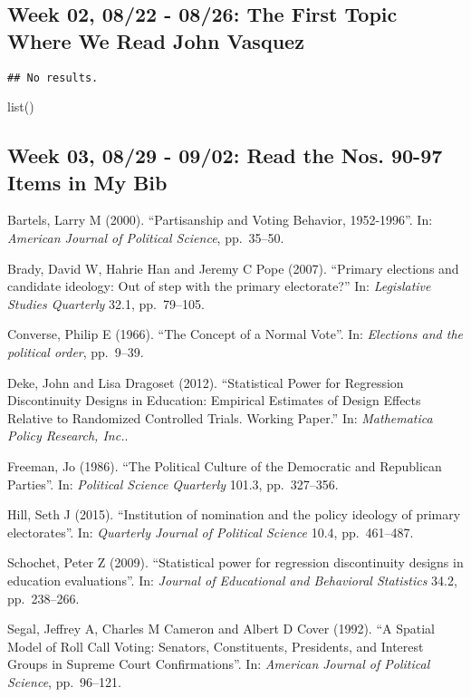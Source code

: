 \documentclass[
      12pt,
        ]{article}
\begin{document}
\hypertarget{week-02-0822---0826-the-first-topic-where-we-read-john-vasquez}{%
\subsection{Week 02, 08/22 - 08/26: The First Topic Where We Read John
Vasquez}\label{week-02-0822---0826-the-first-topic-where-we-read-john-vasquez}}

\begin{verbatim}
## No results.
\end{verbatim}

list()

\hypertarget{week-03-0829---0902-read-the-nos.-90-97-items-in-my-bib}{%
\subsection{Week 03, 08/29 - 09/02: Read the Nos. 90-97 Items in My
Bib}\label{week-03-0829---0902-read-the-nos.-90-97-items-in-my-bib}}

Bartels, Larry M (2000). ``Partisanship and Voting Behavior,
1952-1996''. In: \emph{American Journal of Political Science},
pp.~35--50.

Brady, David W, Hahrie Han and Jeremy C Pope (2007). ``Primary elections
and candidate ideology: Out of step with the primary electorate?'' In:
\emph{Legislative Studies Quarterly} 32.1, pp.~79--105.

Converse, Philip E (1966). ``The Concept of a Normal Vote''. In:
\emph{Elections and the political order}, pp.~9--39.

Deke, John and Lisa Dragoset (2012). ``Statistical Power for Regression
Discontinuity Designs in Education: Empirical Estimates of Design
Effects Relative to Randomized Controlled Trials. Working Paper.'' In:
\emph{Mathematica Policy Research, Inc.}.

Freeman, Jo (1986). ``The Political Culture of the Democratic and
Republican Parties''. In: \emph{Political Science Quarterly} 101.3,
pp.~327--356.

Hill, Seth J (2015). ``Institution of nomination and the policy ideology
of primary electorates''. In:
\emph{Quarterly Journal of Political Science} 10.4, pp.~461--487.

Schochet, Peter Z (2009). ``Statistical power for regression
discontinuity designs in education evaluations''. In:
\emph{Journal of Educational and Behavioral Statistics} 34.2,
pp.~238--266.

Segal, Jeffrey A, Charles M Cameron and Albert D Cover (1992). ``A
Spatial Model of Roll Call Voting: Senators, Constituents, Presidents,
and Interest Groups in Supreme Court Confirmations''. In:
\emph{American Journal of Political Science}, pp.~96--121.
\end{document}
